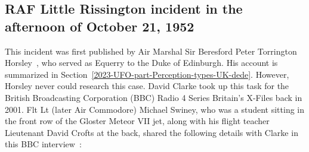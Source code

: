 \subsection{RAF Little Rissington incident in the afternoon of October 21, 1952}

This incident was first published by Air Marshal Sir Beresford Peter Torrington Horsley~\cite[Chapter~10]{Horsley1998Jan}, who served as Equerry to the Duke of Edinburgh.
His account is summarized in Section~\ref{2023-UFO-part-Perception-types-UK-dede}.
However, Horsley never could research this case.
David Clarke took up this task for the British Broadcasting Corporation (BBC) Radio 4 Series Britain's X-Files back in 2001.
Flt Lt (later Air Commodore) Michael Swiney, who was a student sitting in the front row of the Gloster Meteor VII jet,
along with his flight teacher Lieutenant David Crofts at the back, shared the following details with Clarke in this BBC interview~\cite[time=43m00s]{Team2022Sep}:
